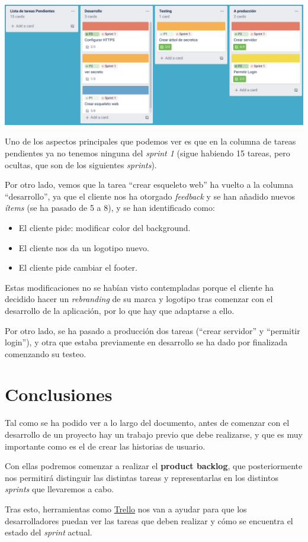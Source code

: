 \documentclass{\ClassPath/viu-tfm-template}
\begin{document}
\vspace{-10pt}
\begin{center}
    \includegraphics[width=\linewidth]{img/board4.png}
\end{center}
\vspace{-10pt}
Uno de los aspectos principales que podemos ver es que en la columna de tareas pendientes ya no tenemos ninguna del \textit{sprint 1} (sigue habiendo 15 tareas, pero ocultas, que son de los siguientes \textit{sprints}).

Por otro lado, vemos que la tarea “crear esqueleto web” ha vuelto a la columna “desarrollo”, ya que el cliente nos ha otorgado \textit{feedback} y se han añadido nuevos \textit{ítems} (se ha pasado de 5 a 8), y se han identificado como:

\begin{itemize}
    \item El cliente pide: modificar color del background.
    \item El cliente nos da un logotipo nuevo.
    \item El cliente pide cambiar el footer.
\end{itemize}

Estas modificaciones no se habían visto contempladas porque el cliente ha decidido hacer un \textit{rebranding} de su marca y logotipo tras comenzar con el desarrollo de la aplicación, por lo que hay que adaptarse a ello.

Por otro lado, se ha pasado a producción dos tareas (“crear servidor” y “permitir login”), y otra que estaba previamente en desarrollo se ha dado por finalizada comenzando su testeo.


\chapter{Conclusiones}

Tal como se ha podido ver a lo largo del documento, antes de comenzar con el desarrollo de un proyecto hay un trabajo previo que debe realizarse, y que es muy importante como es el de crear las historias de usuario.

Con ellas podremos comenzar a realizar el \textbf{product backlog}, que posteriormente nos permitirá distinguir las distintas tareas y representarlas en los distintos \textit{sprints} que llevaremos a cabo.

Tras esto, herramientas como \href{https://trello.com/}{Trello} nos van a ayudar para que los desarrolladores puedan ver las tareas que deben realizar y cómo se encuentra el estado del \textit{sprint} actual.
\end{document}

